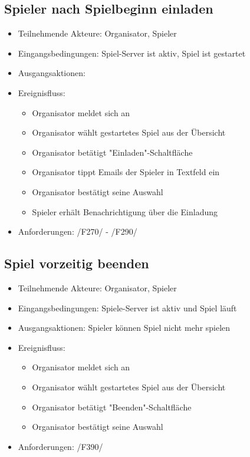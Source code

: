 \documentclass[a4paper]{scrreprt}
\begin{document}
    \subsection{Spieler nach Spielbeginn einladen}
    \begin{itemize}
        \item Teilnehmende Akteure: \Gls{Organisator}, \Gls{Spieler}
        \item Eingangsbedingungen: Spiel-Server ist aktiv, Spiel ist gestartet
        \item Ausgangsaktionen: 
        \item Ereignisfluss:
        \begin{itemize}
            \item \Gls{Organisator} meldet sich an
            \item \Gls{Organisator} wählt gestartetes Spiel aus der Übersicht
            \item \Gls{Organisator} betätigt "Einladen"-Schaltfläche
            \item \Gls{Organisator} tippt Emails der \Gls{Spieler} in Textfeld ein
            \item \Gls{Organisator} bestätigt seine Auswahl
            \item \Gls{Spieler} erhält Benachrichtigung über die Einladung
        \end{itemize}
        \item Anforderungen: /F270/ - /F290/ 
    \end{itemize}

    \subsection{Spiel vorzeitig beenden}
    \begin{itemize}
        \item Teilnehmende Akteure: \Gls{Organisator}, \Gls{Spieler}
        \item Eingangsbedingungen: \Gls{Spiele-Server} ist aktiv und Spiel läuft
        \item Ausgangsaktionen: \Gls{Spieler} können Spiel nicht mehr spielen 
        \item Ereignisfluss:
        \begin{itemize}
            \item \Gls{Organisator} meldet sich an
            \item \Gls{Organisator} wählt gestartetes Spiel aus der Übersicht
            \item \Gls{Organisator} betätigt "Beenden"-Schaltfläche
            \item \Gls{Organisator} bestätigt seine Auswahl
        \end{itemize}
        \item Anforderungen: /F390/
    \end{itemize}
\end{document}
